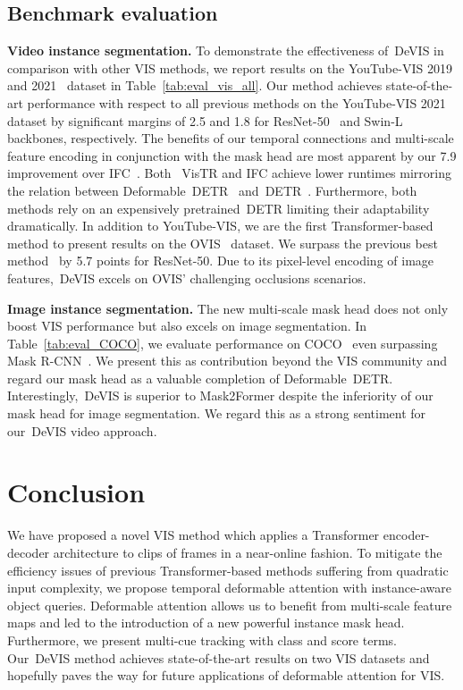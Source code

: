 \documentclass[runningheads]{llncs}
\newcommand{\detr}{\mbox{DETR}}
\newcommand{\vistr}{\mbox{VisTR}}
\newcommand{\evis}{\mbox{DeVIS}}
\begin{document}
\subsection{Benchmark evaluation}
\vspace{-0.2cm}
\noindent \textbf{Video instance segmentation.}
To demonstrate the effectiveness of~\evis{} in comparison with other VIS methods, we report results on the YouTube-VIS 2019 and 2021~\cite{Yang2019vis} dataset in Table~\ref{tab:eval_vis_all}.
Our method achieves state-of-the-art performance with respect to all previous methods on the YouTube-VIS 2021 dataset by significant margins of 2.5 and 1.8 for ResNet-50~\cite{resnet} and Swin-L~\cite{SwinTransformer} backbones, respectively.
The benefits of our temporal connections and multi-scale feature encoding in conjunction with the mask head are most apparent by our 7.9 improvement over IFC~\cite{IFC}.
Both ~\vistr{} and IFC achieve lower runtimes mirroring the relation between Deformable~\detr{}~\cite{deformable_detr} and~\detr{}~\cite{DETR}.
Furthermore, both methods rely on an expensively pretrained~\detr{} limiting their adaptability dramatically.
In addition to YouTube-VIS, we are the first Transformer-based method to present results on the OVIS~\cite{ovis} dataset.
We surpass the previous best method~\cite{cross_vis} by 5.7 points for ResNet-50.
Due to its pixel-level encoding of image features,~\evis{} excels on OVIS' challenging occlusions scenarios.


\noindent \textbf{Image instance segmentation.}
The new multi-scale mask head does not only boost VIS performance but also excels on image segmentation.
In Table~\ref{tab:eval_COCO}, we evaluate performance on COCO~\cite{COCO} even surpassing Mask R-CNN~\cite{he2017mask}.
We present this as contribution beyond the VIS community and regard our mask head as a valuable completion of Deformable~\detr{}. 
Interestingly,~\evis{} is superior to Mask2Former despite the inferiority of our mask head for image segmentation.
We regard this as a strong sentiment for our~\evis{} video approach.



\vspace{-0.2cm} \vspace{-0.2cm}

\section{Conclusion}
\vspace{-0.2cm}
We have proposed a novel VIS method which applies a Transformer encoder-decoder architecture to clips of frames in a near-online fashion.
To mitigate the efficiency issues of previous Transformer-based methods suffering from quadratic input complexity, we propose temporal deformable attention with instance-aware object queries.
Deformable attention allows us to benefit from multi-scale feature maps and led to the introduction of a new powerful instance mask head.
Furthermore, we present multi-cue tracking with class and score terms.
Our~\evis{} method achieves state-of-the-art results on two VIS datasets and hopefully paves the way for future applications of deformable attention for VIS.
\end{document}
